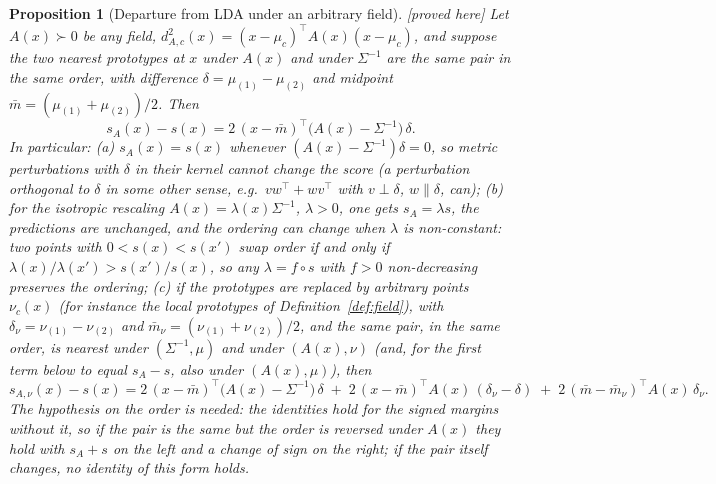\documentclass[10pt,a4paper]{article}
\theoremstyle{plain}
\newtheorem{proposition}[theorem]{Proposition}
\theoremstyle{definition}
\theoremstyle{remark}
\newcommand{\Sig}{\Sigma}
\newcommand{\status}[1]{\textsf{\small [#1]}}
\begin{document}
\begin{proposition}[Departure from LDA under an arbitrary field]\label{prop:departure} \status{proved here}
Let $A(x)\succ0$ be any field, $d^{2}_{A,c}(x)=(x-\mu_c)^{\top}A(x)(x-\mu_c)$, and suppose the two nearest prototypes at $x$ under $A(x)$ and under $\Sig^{-1}$ are the same pair in the same order, with difference $\delta=\mu_{(1)}-\mu_{(2)}$ and midpoint $\bar m=(\mu_{(1)}+\mu_{(2)})/2$. Then
\[
s_A(x)-s(x)=2\,(x-\bar m)^{\top}\big(A(x)-\Sig^{-1}\big)\,\delta .
\]
In particular: (a) $s_A(x)=s(x)$ whenever $(A(x)-\Sig^{-1})\delta=0$, so metric perturbations with $\delta$ in their kernel cannot change the score (a perturbation orthogonal to $\delta$ in some other sense, e.g.\ $vw^{\top}+wv^{\top}$ with $v\perp\delta$, $w\parallel\delta$, can); (b) for the isotropic rescaling $A(x)=\lambda(x)\Sig^{-1}$, $\lambda>0$, one gets $s_A=\lambda s$, the predictions are unchanged, and the ordering \emph{can} change when $\lambda$ is non-constant: two points with $0<s(x)<s(x')$ swap order if and only if $\lambda(x)/\lambda(x')>s(x')/s(x)$, so any $\lambda=f\circ s$ with $f>0$ non-decreasing preserves the ordering; (c) if the prototypes are replaced by arbitrary points $\nu_c(x)$ (for instance the local prototypes of Definition~\ref{def:field}), with $\delta_\nu=\nu_{(1)}-\nu_{(2)}$ and $\bar m_\nu=(\nu_{(1)}+\nu_{(2)})/2$, and the same pair, in the same order, is nearest under $(\Sig^{-1},\mu)$ and under $(A(x),\nu)$ (and, for the first term below to equal $s_A-s$, also under $(A(x),\mu)$), then
\[
s_{A,\nu}(x)-s(x)=2\,(x-\bar m)^{\top}\big(A(x)-\Sig^{-1}\big)\,\delta\;+\;2\,(x-\bar m)^{\top}A(x)\,(\delta_\nu-\delta)\;+\;2\,(\bar m-\bar m_\nu)^{\top}A(x)\,\delta_\nu .
\]
The hypothesis on the order is needed: the identities hold for the \emph{signed} margins without it, so if the pair is the same but the order is reversed under $A(x)$ they hold with $s_A+s$ on the left and a change of sign on the right; if the pair itself changes, no identity of this form holds.
\end{proposition}
\end{document}
